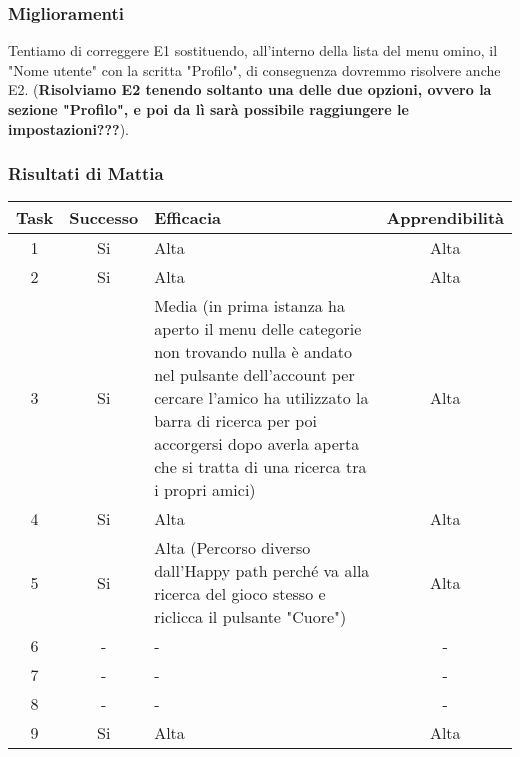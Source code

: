 \documentclass[../Report.tex]{subfiles}
\begin{document}
    \subsubsection{Miglioramenti}
    Tentiamo di correggere E1 sostituendo, all'interno della lista del menu omino, il "Nome utente" con la scritta "Profilo", di conseguenza dovremmo risolvere anche E2. (\textbf{Risolviamo E2 tenendo soltanto una delle due opzioni, ovvero la sezione "Profilo", e poi da lì sarà possibile raggiungere le impostazioni???}). 

    \subsubsection{Risultati di Mattia}
    \begin{table}[H]
        \begin{tabular}{|c|c|p{5cm}|c|}
            \hline
            Task & Successo & Efficacia & Apprendibilità \\
            \hline
            1 & Si & Alta & Alta \\
            \hline
            2 & Si & Alta & Alta \\
            \hline
            3 & Si & Media (in prima istanza ha aperto il menu delle categorie non trovando nulla è andato nel pulsante dell'account per cercare l'amico ha utilizzato la barra di ricerca  per poi accorgersi dopo averla aperta che si tratta di una ricerca tra i propri amici) & Alta \\
            \hline
            4 & Si & Alta  & Alta \\
            \hline
            5 & Si  & Alta (Percorso diverso dall'Happy path perché va alla ricerca del gioco stesso e riclicca il pulsante "Cuore") & Alta \\
            \hline
            6 & - & -  & - \\
            \hline
            7 & - & - & - \\
            \hline
            8 & - & - & - \\
            \hline
            9 & Si & Alta & Alta \\
            \hline
        \end{tabular}

        
    \end{table}
\end{document}
